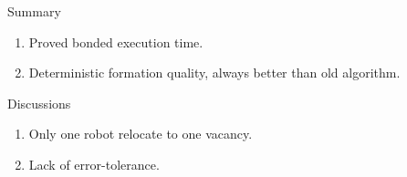 \begin{frame}{Summary}
  \begin{enumerate}
  \item Proved bonded execution time.
  \item Deterministic formation quality, always better than old algorithm.
  \end{enumerate}
  Discussions
  \begin{enumerate}
  \item Only one robot relocate to one vacancy.
  \item Lack of error-tolerance.
  \end{enumerate}
\end{frame}